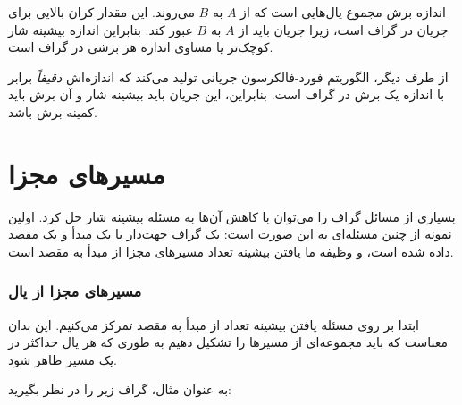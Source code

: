 \begin{center}
\end{center}

اندازه برش مجموع یال‌هایی است که
از $A$ به $B$ می‌روند.
این مقدار کران بالایی برای جریان
در گراف است، زیرا جریان باید
از $A$ به $B$ عبور کند.
بنابراین اندازه بیشینه شار کوچک‌تر یا مساوی
اندازه هر برشی در گراف است.

از طرف دیگر، الگوریتم فورد-فالکرسون
جریانی تولید می‌کند که اندازه‌اش \emph{دقیقاً} برابر
با اندازه یک برش در گراف است.
بنابراین، این جریان باید بیشینه شار
و آن برش باید کمینه برش باشد.

\section{مسیرهای مجزا}

بسیاری از مسائل گراف را می‌توان با کاهش
آن‌ها به مسئله بیشینه شار حل کرد.
اولین نمونه از چنین مسئله‌ای
به این صورت است: یک گراف جهت‌دار
با یک مبدأ و یک مقصد داده شده است،
و وظیفه ما یافتن بیشینه تعداد
مسیرهای مجزا از مبدأ به مقصد است.

\subsubsection{مسیرهای مجزا از یال}

ابتدا بر روی مسئله یافتن
بیشینه تعداد
 از مبدأ به مقصد تمرکز می‌کنیم.
این بدان معناست که باید مجموعه‌ای از مسیرها را تشکیل دهیم
به طوری که هر یال حداکثر در یک مسیر ظاهر شود.

به عنوان مثال، گراف زیر را در نظر بگیرید:
\begin{center}
\end{center}

